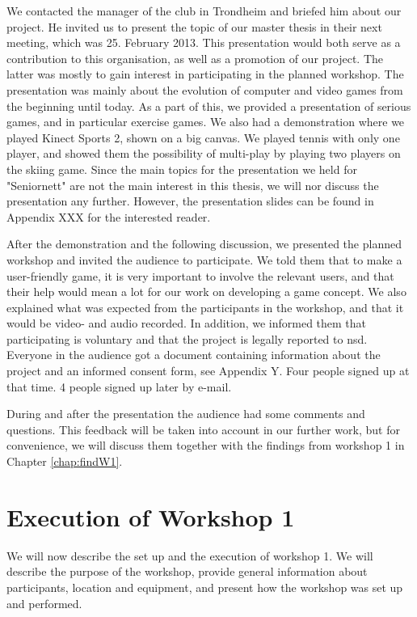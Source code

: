 We contacted the manager of the club in Trondheim and briefed him about our project. He invited us to present the topic of our master thesis in their next meeting, which was 25. February 2013. This presentation would both serve as a contribution to this organisation, as well as a promotion of our project. The latter was mostly to gain interest in participating in the planned workshop. The presentation was mainly about the evolution of computer and video games from the beginning until today. As a part of this, we provided a presentation of serious games, and in particular exercise games. We also had a demonstration where we played Kinect Sports 2, shown on a big canvas. We played tennis with only one player, and showed them the possibility of multi-play by playing two players on the skiing game. Since the main topics for the presentation we held for "Seniornett" are not the main interest in this thesis, we will nor discuss the presentation any further. However, the presentation slides can be found in Appendix XXX for the interested reader. 

After the demonstration and the following discussion, we presented the planned workshop and invited the audience to participate. We told them that to make a user-friendly game, it is very important to involve the relevant users, and that their help would mean a lot for our work on developing a game concept. We also explained what was expected from the participants in the workshop, and that it would be video- and audio recorded. In addition, we informed them that participating is voluntary and that the project is legally reported to \ac{nsd}. Everyone in the audience got a document containing information about the project and an informed consent form, see Appendix Y. Four people signed up at that time. 4 people signed up later by e-mail.

During and after the presentation the audience had some comments and questions. This feedback will be taken into account in our further work, but for convenience, we will discuss them together with the findings from workshop 1 in Chapter \ref{chap:findW1}. 

\section{Execution of Workshop 1}
\label{sec:ws1}
We will now describe the set up and the execution of workshop 1. We will describe the purpose of the workshop, provide general information about participants, location and equipment, and present how the workshop was set up and performed. 

